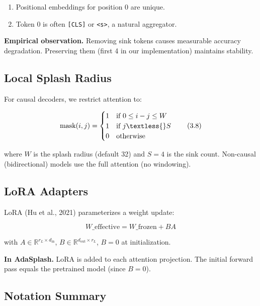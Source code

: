 \begin{enumerate}
\item Positional embeddings for position 0 are unique.
\item Token 0 is often \texttt{[CLS]} or \texttt{\textless{}s\textgreater{}}, a natural aggregator.

\end{enumerate}
\textbf{Empirical observation.} Removing sink tokens causes measurable accuracy 
degradation. Preserving them (first 4 in our implementation) maintains 
stability.

\subsection{Local Splash Radius}

For causal decoders, we restrict attention to:

\[
\text{mask}(i, j) = \begin{cases}
1 & \text{if } 0 \leq i - j \leq W \\
1 & \text{if } j \textless{} S \\
0 & \text{otherwise}
\end{cases}
\tag{3.8}
\]

where $W$ is the splash radius (default 32) and $S = 4$ is the sink count. 
Non-causal (bidirectional) models use the full attention (no windowing).

\subsection{LoRA Adapters}

LoRA (Hu et al., 2021) parameterizes a weight update:

\[
W\_\text{effective} = W\_\text{frozen} + B A
\tag{3.9}
\]

with $A \in \mathbb{R}^{r_L \times d_\text{in}}$, $B \in \mathbb{R}^{d_\text{out} \times r_L}$, 
$B = 0$ at initialization.

\textbf{In AdaSplash.} LoRA is added to each attention projection. The 
initial forward pass equals the pretrained model (since $B = 0$).

\subsection{Notation Summary}

